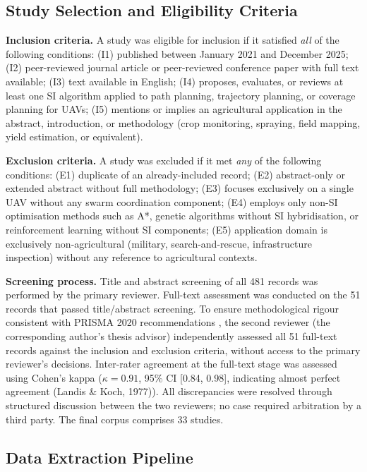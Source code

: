 \documentclass[review,3p,times]{elsarticle}
\begin{document}
\subsection{Study Selection and Eligibility Criteria}

\textbf{Inclusion criteria.} A study was eligible for inclusion if it satisfied \textit{all} of the following conditions: (I1) published between January 2021 and December 2025; (I2) peer-reviewed journal article or peer-reviewed conference paper with full text available; (I3) text available in English; (I4) proposes, evaluates, or reviews at least one SI algorithm applied to path planning, trajectory planning, or coverage planning for UAVs; (I5) mentions or implies an agricultural application in the abstract, introduction, or methodology (crop monitoring, spraying, field mapping, yield estimation, or equivalent).

\textbf{Exclusion criteria.} A study was excluded if it met \textit{any} of the following conditions: (E1) duplicate of an already-included record; (E2) abstract-only or extended abstract without full methodology; (E3) focuses exclusively on a single UAV without any swarm coordination component; (E4) employs only non-SI optimisation methods such as A*, genetic algorithms without SI hybridisation, or reinforcement learning without SI components; (E5) application domain is exclusively non-agricultural (military, search-and-rescue, infrastructure inspection) without any reference to agricultural contexts.

\textbf{Screening process.} Title and abstract screening of all 481 records was performed by the primary reviewer. Full-text assessment was conducted on the 51 records that passed title/abstract screening. To ensure methodological rigour consistent with PRISMA 2020 recommendations \cite{page2021}, the second reviewer (the corresponding author's thesis advisor) independently assessed all 51 full-text records against the inclusion and exclusion criteria, without access to the primary reviewer's decisions. Inter-rater agreement at the full-text stage was assessed using Cohen's kappa ($\kappa=0.91$, 95\% CI [0.84, 0.98], indicating almost perfect agreement (Landis \& Koch, 1977)). All discrepancies were resolved through structured discussion between the two reviewers; no case required arbitration by a third party. The final corpus comprises 33 studies.

\subsection{Data Extraction Pipeline}
\end{document}
